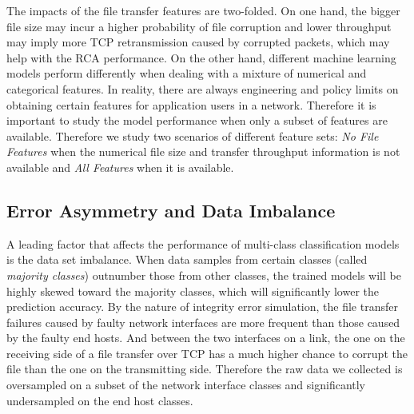 The impacts of the file transfer features are two-folded. On one hand, the bigger file size may incur a higher probability of file corruption and lower throughput may imply more TCP retransmission caused by corrupted packets, which may help with the RCA performance. On the other hand, different machine learning models perform differently when dealing with a mixture of numerical and categorical features. In reality, there are always engineering and policy limits on obtaining certain 
features for application users in a network. Therefore it is important to study the model performance when only a subset of features are available. Therefore we study two scenarios of different feature sets: {\it No File Features} when the numerical file size and transfer throughput information is not available and {\it All Features} when it is available.

\subsection{Error Asymmetry and Data Imbalance} 
\label{sub:ml:imbalance}
A leading factor that affects the performance of multi-class classification models is the data set imbalance. When data samples from certain classes (called {\it majority classes}) outnumber those from other classes, the trained models will be highly skewed toward the majority classes, which will significantly lower the prediction accuracy. By the nature of integrity error simulation, the file transfer failures caused by faulty network interfaces are more frequent than those caused by the faulty end hosts. And between the two interfaces on a link, the one on the receiving side of a file transfer over TCP has a much higher chance to corrupt the file than the one on the transmitting side. Therefore the raw data we collected is oversampled on a subset of the network interface classes and significantly undersampled on the end host classes. 

